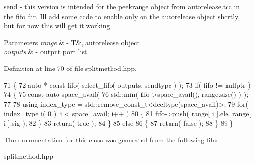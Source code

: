 send -\/ this version is intended for the peekrange object from autorelease.\+tcc in the fifo dir. I\textquotesingle{}ll add some code to enable only on the autorelease object shortly, but for now this will get it working. 
\begin{DoxyParams}{Parameters}
{\em range} & -\/ T\&, autorelease object \\
\hline
{\em outputs} & -\/ output port list \\
\hline
\end{DoxyParams}


Definition at line 70 of file splitmethod.\+hpp.


\begin{DoxyCode}
71    \{
72       \textcolor{keyword}{auto} * \textcolor{keyword}{const} fifo( select\_fifo( outputs, sendtype ) );
73       \textcolor{keywordflow}{if}( fifo != \textcolor{keyword}{nullptr} )
74       \{
75          \textcolor{keyword}{const} \textcolor{keyword}{auto} space\_avail(
76             std::min( fifo->space\_avail(), range.size() ) );
77 
78          \textcolor{keyword}{using} index\_type = std::remove\_const\_t<decltype(space\_avail)>;
79          \textcolor{keywordflow}{for}( index\_type i( 0 ); i < space\_avail; i++ )
80          \{
81             fifo->push( range[ i ].ele, range[ i ].sig );
82          \}
83          \textcolor{keywordflow}{return}( \textcolor{keyword}{true} );
84       \}
85       \textcolor{keywordflow}{else}
86       \{
87          \textcolor{keywordflow}{return}( \textcolor{keyword}{false} );
88       \}
89    \}
\end{DoxyCode}


The documentation for this class was generated from the following file\+:\begin{DoxyCompactItemize}
\item 
splitmethod.\+hpp\end{DoxyCompactItemize}
